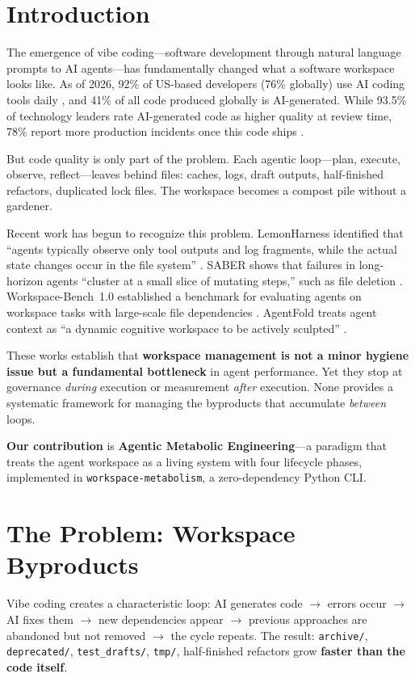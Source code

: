 \documentclass[sigconf,anonymous]{acmart}
\begin{document}
\section{Introduction}
The emergence of vibe coding---software development through natural language prompts to AI agents---has fundamentally changed what a software workspace looks like. As of 2026, 92\% of US-based developers (76\% globally) use AI coding tools daily \cite{jetbrains2026}, and 41\% of all code produced globally is AI-generated. While 93.5\% of technology leaders rate AI-generated code as higher quality at review time, 78\% report more production incidents once this code ships \cite{newrelic2026}.

But code quality is only part of the problem. Each agentic loop---plan, execute, observe, reflect---leaves behind files: caches, logs, draft outputs, half-finished refactors, duplicated lock files. The workspace becomes a compost pile without a gardener.

Recent work has begun to recognize this problem. LemonHarness identified that ``agents typically observe only tool outputs and log fragments, while the actual state changes occur in the file system'' \cite{ren2026lemonharness}. SABER shows that failures in long-horizon agents ``cluster at a small slice of mutating steps,'' such as file deletion \cite{saber2025}. Workspace-Bench~1.0 established a benchmark for evaluating agents on workspace tasks with large-scale file dependencies \cite{tang2026workspacebench}. AgentFold treats agent context as ``a dynamic cognitive workspace to be actively sculpted'' \cite{tongyi2025agentfold}.

These works establish that \textbf{workspace management is not a minor hygiene issue but a fundamental bottleneck} in agent performance. Yet they stop at governance \emph{during} execution or measurement \emph{after} execution. None provides a systematic framework for managing the byproducts that accumulate \emph{between} loops.

\textbf{Our contribution} is \textbf{Agentic Metabolic Engineering}---a paradigm that treats the agent workspace as a living system with four lifecycle phases, implemented in \texttt{workspace-metabolism}, a zero-dependency Python CLI.

\section{The Problem: Workspace Byproducts}
Vibe coding creates a characteristic loop: AI generates code $\rightarrow$ errors occur $\rightarrow$ AI fixes them $\rightarrow$ new dependencies appear $\rightarrow$ previous approaches are abandoned but not removed $\rightarrow$ the cycle repeats. The result: \texttt{archive/}, \texttt{deprecated/}, \texttt{test\_drafts/}, \texttt{tmp/}, half-finished refactors grow \textbf{faster than the code itself}.
\end{document}
